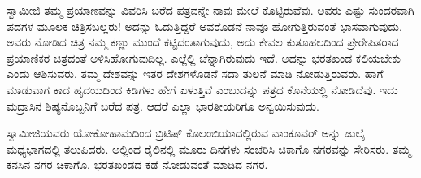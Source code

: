  ಸ್ವಾಮೀಜಿ ತಮ್ಮ ಪ್ರಯಾಣವನ್ನು ವಿವರಿಸಿ ಬರೆದ ಪತ್ರವನ್ನೇ ನಾವು ಮೇಲೆ ಕೊಟ್ಟಿರುವೆವು. ಅವರು ಎಷ್ಟು ಸುಂದರವಾಗಿ ಪದಗಳ ಮೂಲಕ ಚಿತ್ರಿಸಬಲ್ಲರು! ಅದನ್ನು ಓದುತ್ತಿದ್ದರೆ ಅವರೊಡನೆ ನಾವೂ ಹೋಗುತ್ತಿರುವಂತೆ ಭಾಸವಾಗುವುದು. ಅವರು ನೋಡಿದ ಚಿತ್ರ ನಮ್ಮ ಕಣ್ಣು ಮುಂದೆ ಕಟ್ಟಿದಂತಾಗುವುದು, ಅದು ಕೇವಲ ಕುತೂಹಲದಿಂದ ಪ್ರೇರೇಪಿತರಾದ ಪ್ರಯಾಣಿಕರ ಚಿತ್ರದಂತೆ ಅಳಿಸಿಹೋಗುವುದಿಲ್ಲ. ಎಲ್ಲೆಲ್ಲಿ ಚೆನ್ನಾಗಿರುವುದು ಇದೆ. ಅದನ್ನು ಭರತಖಂಡ ಕಲಿಯಬೇಕು ಎಂದು ಆಶಿಸುವರು. ತಮ್ಮ ದೇಶವನ್ನು ಇತರ ದೇಶಗಳೊಡನೆ ಸದಾ ತುಲನೆ ಮಾಡಿ ನೋಡುತ್ತಿರುವರು. ಹಾಗೆ ಮಾಡುವಾಗ ಕಾದ ಹೃದಯದಿಂದ ಕಿಡಿಗಳು ಹೇಗೆ ಏಳುತ್ತಿವೆ ಎಂಬುದನ್ನು ಪತ್ರದ ಕೊನೆಯಲ್ಲಿ ನೋಡಿದೆವು. ಇದು ಮದ್ರಾಸಿನ ಶಿಷ್ಯನೊಬ್ಬನಿಗೆ ಬರೆದ ಪತ್ರ. ಆದರೆ ಎಲ್ಲಾ ಭಾರತೀಯರಿಗೂ ಅನ್ವಯಿಸುವುದು. 

 ಸ್ವಾಮೀಜಿಯವರು ಯೋಕೋಹಾಮದಿಂದ ಬ್ರಿಟಿಷ್ ಕೊಲಂಬಿಯಾದಲ್ಲಿರುವ ವಾಂಕೂವರ್ ಅನ್ನು ಜುಲೈ ಮಧ್ಯಭಾಗದಲ್ಲಿ ತಲುಪಿದರು. ಅಲ್ಲಿಂದ ರೈಲಿನಲ್ಲಿ ಮೂರು ದಿನಗಳು ಸಂಚರಿಸಿ ಚಿಕಾಗೊ ನಗರವನ್ನು ಸೇರಿಸರು. ತಮ್ಮ ಕನಸಿನ ನಗರ ಚಿಕಾಗೊ, ಭರತಖಂಡದ ಕಡೆ ನೋಡುವಂತೆ ಮಾಡಿದ ನಗರ. 

